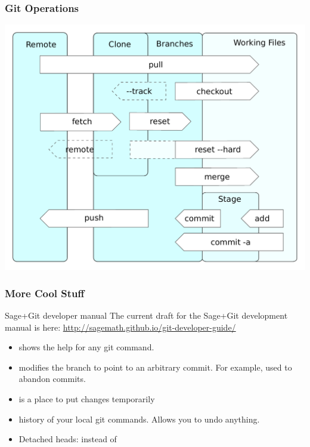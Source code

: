 \documentclass[11pt]{beamer}
\begin{document}
\begin{frame}[plain]
  \frametitle{Git Operations}
  \centering
  \includegraphics[width=0.85\linewidth]{images/git_operations}
\end{frame}



\begin{frame}
  \frametitle{More Cool Stuff}
  
  \begin{block}{Sage+Git developer manual}
    The current draft for the Sage+Git development manual is here:
    \url{http://sagemath.github.io/git-developer-guide/}
  \end{block}

  \begin{itemize}
  \item {} shows the help for any git command.
  \item {} modifies the branch to point to an arbitrary
    commit. For example, used to abandon commits.
  \item {} is a place to put changes temporarily
  \item {} history of your local git commands. Allows
    you to undo anything.
  \item Detached heads:  instead of 
  \end{itemize}
\end{frame}
\end{document}
